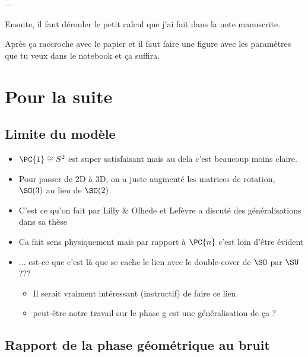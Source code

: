 ---


Ensuite, il faut dérouler le petit calcul que j'ai fait dans la note manuscrite. 

Après ça raccroche avec le papier et il faut faire une figure avec les paramètres que tu veux dans le notebook et ça suffira. 



\section{\todo Pour la suite}\label{sec:2lasuite}


\subsection{\todo Limite du modèle}\label{subsec:limite2model}

\begin{itemize}
	
	\item $\PC{1} \cong S^2$ est super satisfaisant mais au dela c'est beaucoup moins claire.
	
	\item Pour passer de 2D à 3D, on a juste augmenté les matrices de rotation, \ie~$\SO(3)$ au lieu de $\SO(2)$. 
	
	\item C'est ce qu'on fait par Lilly \& Olhede \cite{lilly_modulated_2011} et Lefèvre a discuté des généralisations dans sa thèse \cite{lefevre_polarization_2021}
	
	\item Ca fait sens physiquement mais par rapport à $\PC{n}$ c'est loin d'être évident
	
	\item ... est-ce que c'est là que se cache le lien avec le double-cover de $\SO$ par $\SU$ ???
	\begin{itemize}
		\item Il serait vraiment intéressant (instructif) de faire ce lien 
		
		\item peut-être notre travail sur le phase g est une généralisation de ça ? 
	\end{itemize}
	
\end{itemize}



\subsection{\todo Rapport de la phase géométrique au bruit}\label{subsec:rapportObruit}

